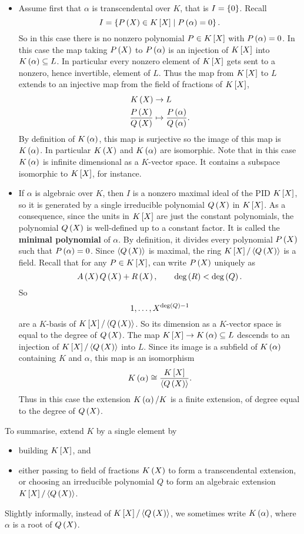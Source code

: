 \begin{itemize}
\item Assume first that $ \alpha $ is transcendental over $ K $, that is $ I = \cb{0} $. Recall
$$ I = \cb{P\rb{X} \in K\sb{X} \mid P\rb{\alpha} = 0}. $$
So in this case there is no nonzero polynomial $ P \in K\sb{X} $ with $ P\rb{\alpha} = 0 $. In this case the map taking $ P\rb{X} $ to $ P\rb{\alpha} $ is an injection of $ K\sb{X} $ into $ K\rb{\alpha} \subseteq L $. In particular every nonzero element of $ K\sb{X} $ gets sent to a nonzero, hence invertible, element of $ L $. Thus the map from $ K\sb{X} $ to $ L $ extends to an injective map from the field of fractions of $ K\sb{X} $,
\begin{align*}
K\rb{X} & \to L \\
\dfrac{P\rb{X}}{Q\rb{X}} & \mapsto \dfrac{P\rb{\alpha}}{Q\rb{\alpha}}.
\end{align*}
By definition of $ K\rb{\alpha} $, this map is surjective so the image of this map is $ K\rb{\alpha} $. In particular $ K\rb{X} $ and $ K\rb{\alpha} $ are isomorphic. Note that in this case $ K\rb{\alpha} $ is infinite dimensional as a $ K $-vector space. It contains a subspace isomorphic to $ K\sb{X} $, for instance.
\item If $ \alpha $ is algebraic over $ K $, then $ I $ is a nonzero maximal ideal of the PID $ K\sb{X} $, so it is generated by a single irreducible polynomial $ Q\rb{X} $ in $ K\sb{X} $. As a consequence, since the units in $ K\sb{X} $ are just the constant polynomials, the polynomial $ Q\rb{X} $ is well-defined up to a constant factor. It is called the \textbf{minimal polynomial} of $ \alpha $. By definition, it divides every polynomial $ P\rb{X} $ such that $ P\rb{\alpha} = 0 $. Since $ \ab{Q\rb{X}} $ is maximal, the ring $ K\sb{X} / \ab{Q\rb{X}} $ is a field. Recall that for any $ P \in K\sb{X} $, can write $ P\rb{X} $ uniquely as
$$ A\rb{X}Q\rb{X} + R\rb{X}, \qquad \deg\rb{R} < \deg\rb{Q}. $$
So
$$ 1, \dots, X^{\deg\rb{Q} - 1} $$
are a $ K $-basis of $ K\sb{X} / \ab{Q\rb{X}} $. So its dimension as a $ K $-vector space is equal to the degree of $ Q\rb{X} $. The map $ K\sb{X} \to K\rb{\alpha} \subseteq L $ descends to an injection of $ K\sb{X} / \ab{Q\rb{X}} $ into $ L $. Since its image is a subfield of $ K\rb{\alpha} $ containing $ K $ and $ \alpha $, this map is an isomorphism
$$ K\rb{\alpha} \cong \dfrac{K\sb{X}}{\ab{Q\rb{X}}}. $$
Thus in this case the extension $ K\rb{\alpha} / K $ is a finite extension, of degree equal to the degree of $ Q\rb{X} $.
\end{itemize}
To summarise, extend $ K $ by a single element by
\begin{itemize}
\item building $ K\sb{X} $, and
\item either passing to field of fractions $ K\rb{X} $ to form a transcendental extension, or choosing an irreducible polynomial $ Q $ to form an algebraic extension $ K\sb{X} / \ab{Q\rb{X}} $.
\end{itemize}
Slightly informally, instead of $ K\sb{X} / \ab{Q\rb{X}} $, we sometimes write $ K\rb{\alpha} $, where $ \alpha $ is a root of $ Q\rb{X} $.

